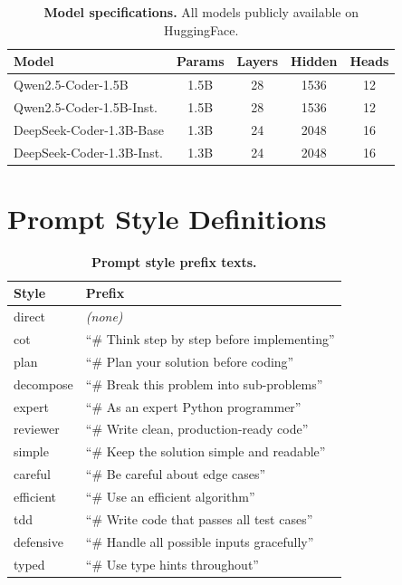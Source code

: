 \documentclass[11pt]{article}
\begin{document}
\begin{table}[t]
    \centering
    \caption{\textbf{Model specifications.} All models publicly available on HuggingFace.}
    \label{tab:model_specs}
    \small
    \begin{tabular}{lcccc}
        \toprule
        \textbf{Model} & \textbf{Params} & \textbf{Layers} & \textbf{Hidden} & \textbf{Heads} \\
        \midrule
        Qwen2.5-Coder-1.5B       & 1.5B & 28 & 1536 & 12 \\
        Qwen2.5-Coder-1.5B-Inst. & 1.5B & 28 & 1536 & 12 \\
        DeepSeek-Coder-1.3B-Base & 1.3B & 24 & 2048 & 16 \\
        DeepSeek-Coder-1.3B-Inst.& 1.3B & 24 & 2048 & 16 \\
        \bottomrule
    \end{tabular}
\end{table}

\section{Prompt Style Definitions}
\label{app:prompts}

\begin{table}[t]
    \centering
    \caption{\textbf{Prompt style prefix texts.}}
    \label{tab:prompt_styles}
    \small
    \begin{tabular}{ll}
        \toprule
        \textbf{Style} & \textbf{Prefix} \\
        \midrule
        direct     & \emph{(none)} \\
        cot        & ``\# Think step by step before implementing'' \\
        plan       & ``\# Plan your solution before coding'' \\
        decompose  & ``\# Break this problem into sub-problems'' \\
        expert     & ``\# As an expert Python programmer'' \\
        reviewer   & ``\# Write clean, production-ready code'' \\
        simple     & ``\# Keep the solution simple and readable'' \\
        careful    & ``\# Be careful about edge cases'' \\
        efficient  & ``\# Use an efficient algorithm'' \\
        tdd        & ``\# Write code that passes all test cases'' \\
        defensive  & ``\# Handle all possible inputs gracefully'' \\
        typed      & ``\# Use type hints throughout'' \\
        \bottomrule
    \end{tabular}
\end{table}
\end{document}
